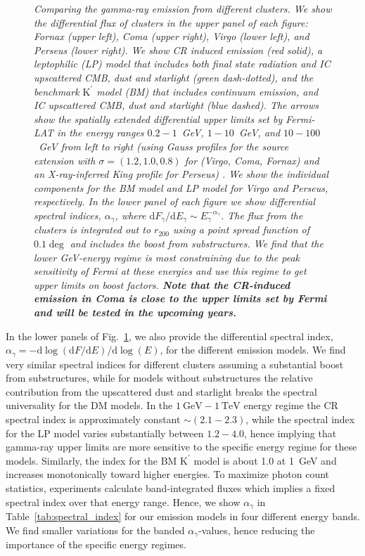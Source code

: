 \documentclass[10pt,aps,pra,reprint,amsmath,amsfonts,amssymb,showpacs,nofootinbib,floatfix]{revtex4-1}
\def\C#1{{\bf #1}}
\newcommand{\Fermi}{{\em Fermi}\xspace}
\newcommand{\rmn}{\mathrm}
\newcommand{\Kp}{\rmn{K}^\prime}
\newcommand{\gev}{\rmn{GeV}}
\newcommand{\tev}{\rmn{TeV}}
\newcommand{\dd}{\rmn{d}}
\newcommand{\rvir}{r_{200}}
\begin{document}
\begin{figure}
\begin{minipage}{2.0\columnwidth}
\caption{\it Comparing the gamma-ray emission from different
  clusters. We show the differential flux of clusters in the upper
  panel of each figure: Fornax (upper left), Coma (upper right), Virgo
  (lower left), and Perseus (lower right). We show CR induced emission
  (red solid), a leptophilic (LP) model that includes both final state
  radiation and IC upscattered CMB, dust and starlight (green
  dash-dotted), and the benchmark $\Kp$ model (BM) that includes
  continuum emission, and IC upscattered CMB, dust and starlight (blue
  dashed). The arrows show the spatially extended differential upper
  limits set by \Fermi-LAT in the energy ranges $0.2-1$~GeV,
  $1-10$~GeV, and $10-100$~GeV from left to right (using Gauss
  profiles for the source extension with $\sigma=(1.2,1.0,0.8)$ for
  (Virgo, Coma, Fornax) and an X-ray-inferred King profile for
  Perseus) \cite{2010ApJ...717L..71A}. We show the individual
  components for the BM model and LP model for Virgo and Perseus,
  respectively. In the lower panel of each figure we show differential
  spectral indices, $\alpha_\gamma$, where $\dd F_\gamma/\dd E_\gamma
  \sim E_\gamma^{-\alpha_\gamma}$. The flux from the clusters is
  integrated out to $\rvir$ using a point spread function of $0.1\deg$
  and includes the boost from substructures. We find that the lower
  GeV-energy regime is most constraining due to the peak sensitivity
  of \Fermi at these energies and use this regime to get upper limits
  on boost factors. \C{Note that the CR-induced emission in
    Coma is close to the upper limits set by \Fermi and will be tested
    in the upcoming years.}}
 \label{fig:clu_comp}
\end{minipage}
\end{figure}

In the lower panels of Fig.~\ref{fig:clu_comp}, we also provide the
differential spectral index, $\alpha_\gamma=-\dd \log(\dd F/\dd E)/\dd
\log(E)$, for the different emission models. We find very similar
spectral indices for different clusters assuming a substantial boost
from substructures, while for models without substructures the
relative contribution from the upscattered dust and starlight breaks
the spectral universality for the DM models. In the $1~\gev-1~\tev$
energy regime the CR spectral index is approximately constant $\sim
(2.1-2.3)$, while the spectral index for the LP model varies
substantially between $1.2-4.0$, hence implying that gamma-ray upper
limits are more sensitive to the specific energy regime for these
models. Similarly, the index for the BM $\Kp$ model is about 1.0 at
1~GeV and increases monotonically toward higher energies. To maximize
photon count statistics, experiments calculate band-integrated fluxes
which implies a fixed spectral index over that energy range. Hence, we
show $\alpha_\gamma$ in Table~\ref{tab:spectral_index} for our
emission models in four different energy bands. We find smaller
variations for the banded $\alpha_\gamma$-values, hence reducing the
importance of the specific energy regimes.
\end{document}
